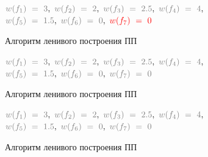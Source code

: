 \documentclass[utf8]{beamer}
\begin{document}
\begin{frame}
	\begin{exampleblock}{}
		\begin{center} 
				
				${\color{gray}w(f_1)\ =\ 3},\ {\color{gray}w(f_2)\ =\ 2},\
				{\color{gray}w(f_3)\ =\ 2.5},\ {\color{gray}w(f_4)\ =\ 4},$ 
				\\${\color{gray}w(f_5)\ =\ 1.5},\ {\color{gray}w(f_6)\ =\ 0},\
				{\color{red}w(f_7)\ =\ 0}$
		
	\end{center}  
	\end{exampleblock}
	\begin{block}{Алгоритм ленивого построения ПП}
		\picLazyCNinth                              
	\end{block}
\end{frame} 

\begin{frame}
	\begin{exampleblock}{}
		\begin{center} 
				${\color{gray}w(f_1)\ =\ 3},\ {\color{gray}w(f_2)\ =\ 2},\
				{\color{gray}w(f_3)\ =\ 2.5},\ {\color{gray}w(f_4)\ =\ 4},$ 
				\\${\color{gray}w(f_5)\ =\ 1.5},\ {\color{gray}w(f_6)\ =\ 0},\
				{\color{gray}w(f_7)\ =\ 0}$
		\end{center}  
	\end{exampleblock}
	\begin{block}{Алгоритм ленивого построения ПП}
		\picLazyCTenth                           
	\end{block}
\end{frame}  

\begin{frame}
	\begin{exampleblock}{}
		\begin{center} 
				${\color{gray}w(f_1)\ =\ 3},\ {\color{gray}w(f_2)\ =\ 2},\
				{\color{gray}w(f_3)\ =\ 2.5},\ {\color{gray}w(f_4)\ =\ 4},$ 
				\\${\color{gray}w(f_5)\ =\ 1.5},\ {\color{gray}w(f_6)\ =\ 0},\
				{\color{gray}w(f_7)\ =\ 0}$
		\end{center}  
	\end{exampleblock}
	\begin{block}{Алгоритм ленивого построения ПП}
		\picLazyCEleventh                           
	\end{block}
\end{frame}      
\end{document}

